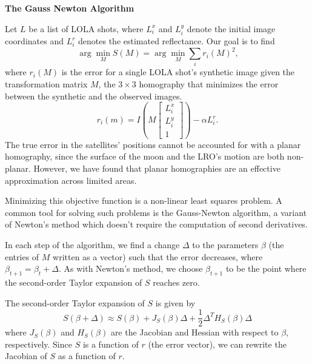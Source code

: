 {\bf The Gauss Newton Algorithm}

Let $L$ be a list of LOLA shots, where $L_i^x$ and $L_i^y$ denote the initial image coordinates and
$L_i^r$ denotes the estimated reflectance. Our goal is to find 
$$\arg \min_M S(M) = \arg \min_M \sum_i r_i(M)^2\mbox{,}$$
where $r_i(M)$ is the error for a single LOLA shot's synthetic image given the transformation matrix $M$,
the $3 \times 3$ homography that minimizes the error between the synthetic and the observed images.
$$r_i(m) = I\left(M \left[\begin{array}{c}L_i^x\\ L_i^y\\ 1\end{array}\right]\right) - \alpha L_i^r\mbox{.}$$
The true error in the satellites' positions cannot be accounted for with a planar homography, since the
surface of the moon and the LRO's motion are both non-planar. However, we have found that planar
homographies are an effective approximation across limited areas.

Minimizing this objective function is a non-linear least squares problem. A common tool for solving
such problems is the Gauss-Newton algorithm, a variant of Newton's method which doesn't require
the computation of second derivatives.

In each step of the algorithm, we find a change $\Delta$ to the parameters $\beta$ (the entries of $M$ written as
a vector) such that the error decreases, where $\beta_{t+1} = \beta_t + \Delta$. As with Newton's method,
we choose $\beta_{t+1}$ to be the point where the second-order Taylor expansion of $S$ 
reaches zero.

The second-order Taylor expansion of $S$ is given by
$$S(\beta + \Delta) \approx S(\beta) + J_S(\beta) \Delta + \frac{1}{2}\Delta^T H_S(\beta) \Delta$$
where $J_S(\beta)$ and $H_S(\beta)$ are the Jacobian and Hessian with respect to $\beta$, respectively.
Since $S$ is a function of $r$ (the error vector), we can rewrite the Jacobian of $S$ as a function of $r$.

